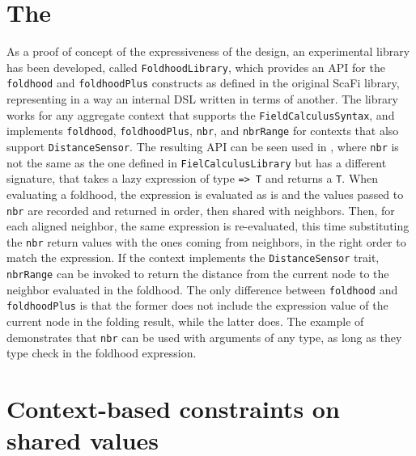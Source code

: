 \section{The } \label{chap:implementation->sec:foldhood-library}

As a proof of concept of the expressiveness of the \this design, an experimental library has been developed, called \texttt{FoldhoodLibrary}, which provides an \ac{API} for the \texttt{foldhood} and \texttt{foldhoodPlus} constructs as defined in the original ScaFi library, representing in a way an internal \ac{DSL} written in terms of another.
%
The library works for any aggregate context that supports the \texttt{FieldCalculusSyntax}, and implements \texttt{foldhood}, \texttt{foldhoodPlus}, \texttt{nbr}, and \texttt{nbrRange} for contexts that also support \texttt{DistanceSensor}.
%
The resulting \ac{API} can be seen used in ,
where \texttt{nbr} is not the same as the one defined in \texttt{FielCalculusLibrary} but has a different signature, that takes a lazy expression of type \texttt{=> T} and returns a \texttt{T}.
%
When evaluating a foldhood, the expression is evaluated as is and the values passed to \texttt{nbr} are recorded and returned in order, then shared with neighbors.
%
Then, for each aligned neighbor, the same expression is re-evaluated, this time substituting the \texttt{nbr} return values with the ones coming from neighbors, in the right order to match the expression.
%
If the context implements the \texttt{DistanceSensor} trait, \texttt{nbrRange} can be invoked to return the distance from the current node to the neighbor evaluated in the foldhood.
%
The only difference between \texttt{foldhood} and \texttt{foldhoodPlus} is that the former does not include the expression value of the current node in the folding result, while the latter does.
%
The example of  demonstrates that \texttt{nbr} can be used with arguments of any type, as long as they type check in the foldhood expression.




\section{Context-based constraints on shared values} \label{chap:implementation->sec:context-based-constraints}

